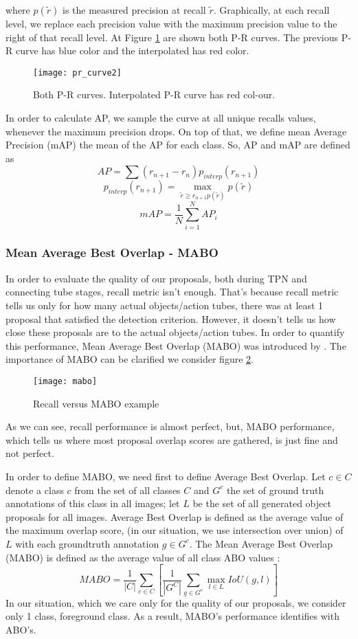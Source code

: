 where $p(\tilde{r})$ is the measured precision at recall $\tilde{r}$. Graphically, at each recall level, we replace each precision value
with the maximum precision value to the right of that recall level.  At Figure \ref{fig:pr_curve2} are shown both P-R curves. The previous P-R curve has blue
color and the interpolated has red color.

\begin{figure}[h]
  \centering
  \texttt{[image: pr\_curve2]}
  \caption{Both P-R curves. Interpolated P-R curve has red col-our.}
  \label{fig:pr_curve2}
\end{figure}

In order to calculate AP, we sample the curve at all unique recalls values, whenever the maximum precision drops. On top of that, we define mean Average Precision (mAP)
the mean of the AP for each class. So, AP and mAP are defined as
\[  AP = \sum (r_{n+1} - r_n) p_{interp} (r_{n+1}) \]
\[ p_{interp}(r_{n+1}) = \max_{\tilde{r} \ge r_{n+1} p(\tilde{r})}p(\tilde{r}) \]
\[ mAP = \frac{1}{N} \sum_{i=1}^N AP_i \]

\subsubsection{Mean Average Best Overlap - MABO}

In order to evaluate the quality of our proposals, both during TPN and connecting tube stages, recall metric isn't enough.
That's because recall metric tells us only for how many actual objects/action tubes, there was at least 1 proposal that satisfied the detection
criterion. However, it doesn't tells us how close these proposals are to the actual objects/action tubes. In order to quantify this performance,
Mean Average Best Overlap (MABO) was introduced by \cite{DBLP:journals/corr/WinschelLE16}. The importance of MABO can be clarified 
we consider figure \ref{fig:mabo_fig}.

\begin{figure}[h]
  \centering
  \texttt{[image: mabo]}
  \caption{Recall versus MABO example}
  \label{fig:mabo_fig}
\end{figure}

As we can see, recall performance is almost perfect, but, MABO performance, which tells us where most proposal overlap scores are gathered,
is just fine and not perfect. \par
In order to define MABO, we need first to define Average Best Overlap. Let $ c \in C$ denote a class $c$ from the set of all
classes $C$ and $G^c$ the set of ground truth annotations of this class in all images; let $L$ be the set of all generated object proposals
for all images. Average Best Overlap is defined as the average value of the maximum overlap score, (in our situation, we use intersection
over union) of $L$ with each groundtruth annotation $g \in G^c$. The Mean Average Best Overlap (MABO) is defined as the average value of all
class ABO values :
\[ MABO = \frac{1}{|C|} \sum_{c \in C} [ \frac {1}{|G^C|} \sum_{g \in G^c} \max_{l \in L} IoU(g,l)]  \]
In our situation, which we care only for the quality of our proposals,  we consider only 1 class, foreground class. As a result, MABO's performance identifies with ABO's.


